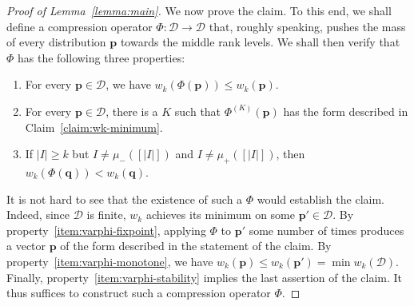 \documentclass[11pt,a4paper,reqno]{amsart}
\numberwithin{claim}{thm}
\theoremstyle{definition}
\newcommand{\bp}{\mathbf{p}}
\newcommand{\bq}{\mathbf{q}}
\newcommand{\cD}{\mathcal{D}}
\newcommand{\mum}{\mu_-}
\newcommand{\mup}{\mu_+}
\renewcommand{\le}{\leqslant}
\renewcommand{\ge}{\geqslant}
\begin{document}
\begin{proof}[{Proof of Lemma~\ref{lemma:main}}]
  We now prove the claim. To this end, we shall define a compression operator $\Phi \colon \cD \to \cD$ that, roughly speaking, pushes the mass of every distribution $\bp$ towards the middle rank levels. We shall then verify that $\Phi$ has the following three properties:
  \begin{enumerate}[label={(P\arabic*)}]
  \item
    \label{item:varphi-monotone}
    For every $\bp \in \cD$, we have $w_k(\Phi(\bp)) \le w_k(\bp)$.
  \item
    \label{item:varphi-fixpoint}
    For every $\bp \in \cD$, there is a $K$ such that $\Phi^{(K)}(\bp)$ has the form described in Claim~\ref{claim:wk-minimum}.
  \item
    \label{item:varphi-stability}
    If $|I| \ge k$ but $I \neq \mum([|I|])$ and $I \neq \mup([|I|])$, then $w_k(\Phi(\bq)) < w_k(\bq)$.
  \end{enumerate}
  It is not hard to see that the existence of such a $\Phi$ would establish the claim. Indeed, since $\cD$ is finite, $w_k$ achieves its minimum on some $\bp' \in \cD$. By property~\ref{item:varphi-fixpoint}, applying $\Phi$ to $\bp'$ some number of times produces a vector $\bp$ of the form described in the statement of the claim. By property~\ref{item:varphi-monotone}, we have $w_k(\bp) \le w_k(\bp') = \min w_k(\cD)$. Finally, property~\ref{item:varphi-stability} implies the last assertion of the claim. It thus suffices to construct such a compression operator $\Phi$.


\end{proof}
\end{document}
